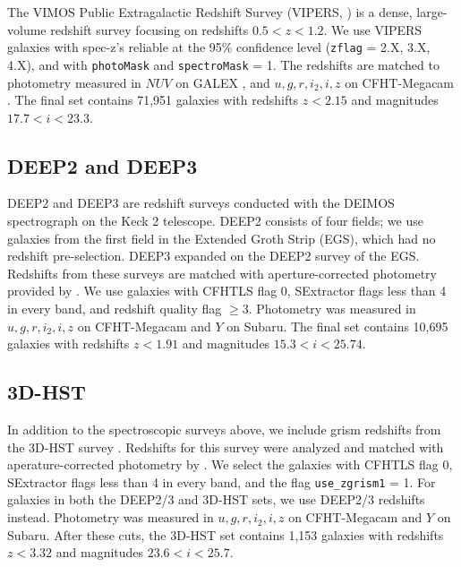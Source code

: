 The VIMOS Public Extragalactic Redshift Survey (VIPERS, \citealt{Scodeggio2018a}) is a dense, large-volume redshift survey focusing on redshifts $0.5 < z < 1.2$.
We use VIPERS galaxies with spec-z's reliable at the 95\% confidence level (\texttt{zflag} = 2.X, 3.X, 4.X), and with \texttt{photoMask} and \texttt{spectroMask} = 1.
The redshifts are matched to photometry measured in $NUV$ on GALEX \citep{Martin2005a}, and $u,g,r,i_2,i,z$ on CFHT-Megacam \citep{Hudelot2012}. 
The final set contains 71,951 galaxies with redshifts $z < 2.15$ and magnitudes $17.7 < i < 23.3$. 

\subsection{DEEP2 and DEEP3}

DEEP2 and DEEP3 are redshift surveys conducted with the DEIMOS spectrograph on the Keck 2 telescope.
DEEP2 \citep{Newman2013b} consists of four fields; we use galaxies from the first field in the Extended Groth Strip (EGS), which had no redshift pre-selection.
DEEP3 \citep{Cooper2011} expanded on the DEEP2 survey of the EGS.
Redshifts from these surveys are matched with aperture-corrected photometry provided by \citet{Zhou2019a}.
We use galaxies with CFHTLS flag 0, SExtractor flags less than 4 in every band, and redshift quality flag $\geq 3$.
Photometry was measured in $u,g,r,i_2,i,z$ on CFHT-Megacam and $Y$ on Subaru.
The final set contains 10,695 galaxies with redshifts $z < 1.91$ and magnitudes $15.3 < i < 25.74$.


\subsection{3D-HST}

In addition to the spectroscopic surveys above, we include grism redshifts from the 3D-HST survey \citep{Newman2013b,Momcheva2016b}.
Redshifts for this survey were analyzed and matched with aperature-corrected photometry by \citet{Zhou2019a}.
We select the galaxies with CFHTLS flag 0, SExtractor flags less than 4 in every band, and the flag \texttt{use\_zgrism1} = 1.
For galaxies in both the DEEP2/3 and 3D-HST sets, we use DEEP2/3 redshifts instead.
Photometry was measured in $u,g,r,i_2,i,z$ on CFHT-Megacam and $Y$ on Subaru.
After these cuts, the 3D-HST set contains 1,153 galaxies with redshifts $z < 3.32$ and magnitudes $23.6 < i < 25.7$.



